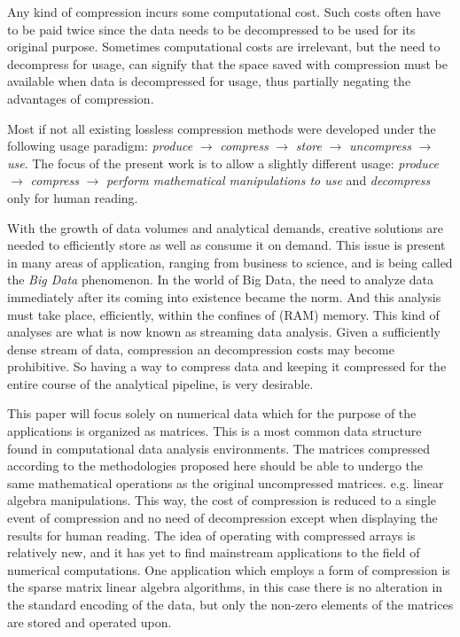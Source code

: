 \documentclass[10pt]{article}
\begin{document}
Any kind of compression incurs some computational cost. Such costs often have to be paid twice since the data needs to be decompressed to be used for its original purpose. Sometimes computational costs are irrelevant, but the need to decompress for usage, can signify that the space saved with compression must be available when data is decompressed for usage, thus partially negating the advantages of compression.

Most if not all existing lossless compression methods were developed under the following usage paradigm: \textit{produce} $\rightarrow$ \textit{compress} $\rightarrow$ \textit{store} $\rightarrow$ \textit{uncompress} $\rightarrow$ \textit{use}. The focus of the present work is to allow a slightly different usage:  \textit{produce} $\rightarrow$ \textit{compress} $\rightarrow$ \textit{perform mathematical manipulations to use} and \textit{decompress} only for human reading.

With the growth of data volumes and analytical demands, creative solutions are needed to efficiently store as well as consume it on demand. This issue is present in many areas of application, ranging from business to science\cite{lynch}, and is being called the \textit{Big Data} phenomenon. In the world of Big Data, the need to analyze data immediately after its coming into existence became the norm. And this analysis must take place, efficiently, within the confines of (RAM) memory. This kind of analyses are what is now known as streaming data analysis\cite{gaber2005mining}. Given a sufficiently dense stream of data, compression an decompression costs may become prohibitive. So having a way to compress data and keeping it compressed for the entire course of the analytical pipeline, is very desirable.

This paper will focus solely on numerical data which for the purpose of the applications is organized as   matrices. This is a most common data structure found in computational data analysis environments. The matrices compressed according to the methodologies proposed here should be able to undergo the same mathematical operations as the original uncompressed matrices. e.g. linear algebra manipulations. This way, the cost of compression is reduced to a single event of compression and no need of decompression except when displaying the results for human reading. The idea of operating with compressed arrays is relatively new\cite{yemliha2007compiler}, and it has yet to find mainstream applications to the field of numerical computations. One application which employs a form of compression is the sparse matrix linear algebra algorithms\cite{dodson1991sparse}, in this case there is no alteration in the standard encoding of the data, but only the non-zero elements of the matrices are stored and operated upon. 
\end{document}
